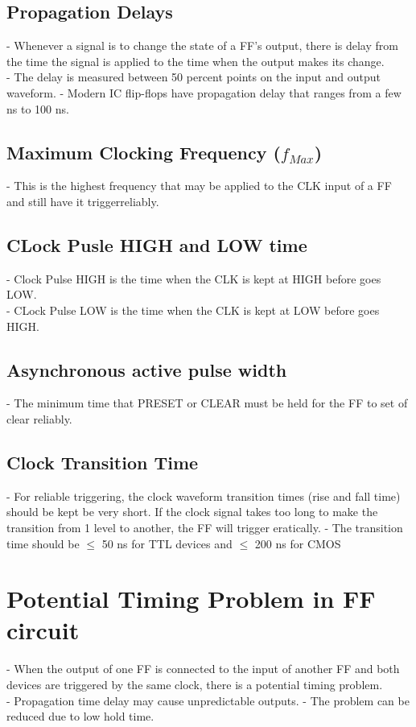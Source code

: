 \documentclass[12pt]{article}
\begin{document}
\subsection{Propagation Delays}
- Whenever a signal is to change the state of a FF's output, there is delay from the time the signal is applied to the time when the output makes its change. \\
- The delay is measured between 50 percent points on the input and output waveform.
- Modern IC flip-flops have propagation delay that ranges from a few ns to 100 ns.
\subsection{Maximum Clocking Frequency ($f_{Max}$)}
- This is the highest frequency that may be applied to the CLK input of a FF and still have it triggerreliably.
\subsection{CLock Pusle HIGH and LOW time}
- Clock Pulse HIGH is the time when the CLK is kept at HIGH before goes LOW. \\
- CLock Pulse LOW is the time when the CLK is kept at LOW before goes HIGH. \\
\subsection{Asynchronous active pulse width}
- The minimum time that PRESET or CLEAR must be held for the FF to set of clear reliably.
\subsection{Clock Transition Time}
- For reliable triggering, the clock waveform transition times (rise and fall time) should be kept be very short. If the clock signal takes too long to make the transition from 1 level to another, the FF will trigger eratically.
- The transition time should be $\le$ 50 ns for TTL devices and $\le$ 200 ns for CMOS
\section{Potential Timing Problem in FF circuit}
- When the output of one FF is connected to the input of another FF and both devices are triggered by the same clock, there is a potential timing problem. \\
- Propagation time delay may cause unpredictable outputs.
- The problem can be reduced due to low hold time.
\end{document}
